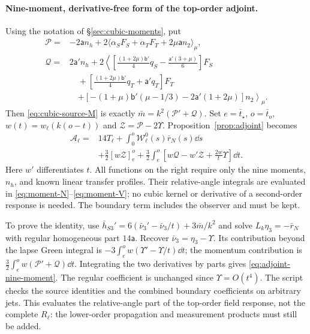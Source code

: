 \paragraph{Nine-moment, derivative-free form of the top-order adjoint.}
Using the notation of \S\ref{sec:cubic-moments}, put
\begin{align*}
 \mathscr P={}&-2\mathsf a n_h
 +2\langle\alpha_SF_S+\alpha_TF_T+2\mu\mathsf a n_2\rangle_\mu,\\
 \mathscr Q={}&2\mathsf a'n_h+2\left\langle
 \left[\frac{(1+2\mu)\mathsf b'}4q_S-\frac{\mathsf a'(3+\mu)}6\right]F_S\right.\\
 &\quad+\left[\frac{(1+2\mu)\mathsf b'}4q_T+\mathsf a'q_T\right]F_T\\
 &\quad\left.+\left[-(1+\mu)\mathsf b'(\mu-1/3)-2\mathsf a'(1+2\mu)\right]n_2
 \right\rangle_\mu .
\end{align*}
Then \eqref{eq:cubic-source-M} is exactly $\bar m=k^2(\mathscr P'+\mathscr Q)$.
Set $e=\bar t_\star$, $o=\bar t_o$, $w(t)=w_\ell(k(o-t))$ and
$\mathscr Z=\mathscr P-2\Upsilon$. Proposition~\ref{prop:adjoint} becomes
\begin{equation}\label{eq:adjoint-nine-moment}
\boxed{\begin{aligned}
 \mathcal A_\ell={}&14T_\ell+\int_0^o\mathcal W^0_\ell(s)\bar r_N(s)\dd s\\
 &+\frac32[w\mathscr Z]_e^o
 +\frac32\int_e^o\left[w\mathscr Q-w'\mathscr Z+\frac{2w}{t}\Upsilon\right]\dd t.
\end{aligned}}
\end{equation}
Here $w'$ differentiates $t$. All functions on the right require only the nine moments,
$n_h$, and known linear transfer profiles. Their relative-angle integrals are evaluated in
\eqref{eq:moment-N}--\eqref{eq:moment-V}; no cubic kernel or derivative of a second-order
response is needed. The boundary term includes the observer and must be kept.

To prove the identity, use
$\bar h_{S3}'=6(\bar\nu_3'-\bar\nu_3/t)+3\bar m/k^2$ and solve
$L_k\eta_3=-\bar r_N$ with regular homogeneous part $14\mathsf a$.
Recover $\bar\nu_3=\eta_3-\Upsilon$. Its contribution beyond the lapse Green integral is
$-3\int_e^ow(\Upsilon'-\Upsilon/t)\dd t$; the momentum contribution is
$\frac32\int_e^ow(\mathscr P'+\mathscr Q)\dd t$. Integrating the two derivatives by parts
gives \eqref{eq:adjoint-nine-moment}. The regular coefficient is unchanged since
$\Upsilon=O(t^4)$. The script  checks the
source identities and the combined boundary coefficients on arbitrary jets.
This evaluates the relative-angle part of the top-order field response, not the complete
$R_\ell$: the lower-order propagation and measurement products must still be added.
